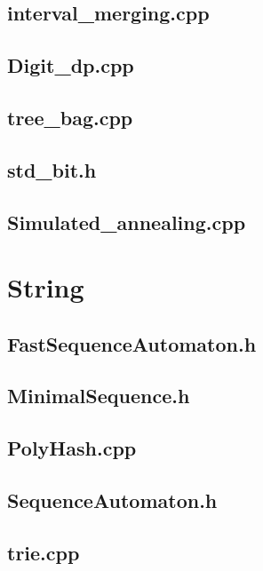 \subsection{interval\_merging.cpp}

\subsection{Digit\_dp.cpp}

\subsection{tree\_bag.cpp}

\subsection{std\_bit.h}

\subsection{Simulated\_annealing.cpp}

\section{String}
\subsection{FastSequenceAutomaton.h}

\subsection{MinimalSequence.h}

\subsection{PolyHash.cpp}

\subsection{SequenceAutomaton.h}

\subsection{trie.cpp}

